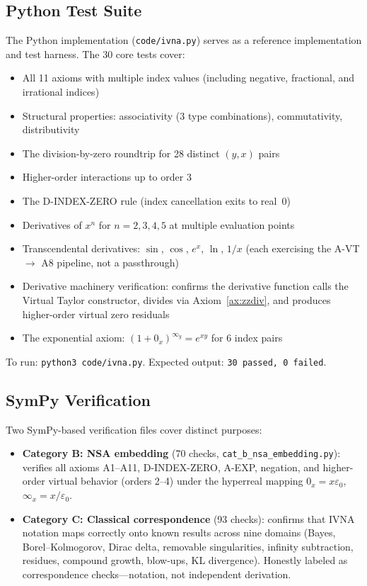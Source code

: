 \documentclass[12pt]{article}
\theoremstyle{definition}
\theoremstyle{remark}
\newcommand{\vz}[1]{0_{#1}}             %
\newcommand{\vi}[1]{\infty_{#1}}        %
\begin{document}
\subsection{Python Test Suite}

The Python implementation (\texttt{code/ivna.py}) serves as a reference
implementation and test harness. The 30 core tests cover:

\begin{itemize}
\item All 11 axioms with multiple index values (including negative,
  fractional, and irrational indices)
\item Structural properties: associativity (3 type combinations),
  commutativity, distributivity
\item The division-by-zero roundtrip for 28 distinct $(y, x)$ pairs
\item Higher-order interactions up to order 3
\item The D-INDEX-ZERO rule (index cancellation exits to real~0)
\item Derivatives of $x^n$ for $n = 2, 3, 4, 5$ at multiple evaluation points
\item Transcendental derivatives: $\sin$, $\cos$, $e^x$, $\ln$, $1/x$
  (each exercising the A-VT $\to$ A8 pipeline, not a passthrough)
\item Derivative machinery verification: confirms the derivative
  function calls the Virtual Taylor constructor, divides via
  Axiom~\ref{ax:zzdiv}, and produces higher-order virtual zero
  residuals
\item The exponential axiom: $(1 + \vz{x})^{\vi{y}} = e^{xy}$ for
  6 index pairs
\end{itemize}

\noindent
To run: \texttt{python3 code/ivna.py}. Expected output:
\texttt{30 passed, 0 failed}.

\subsection{SymPy Verification}

Two SymPy-based verification files cover distinct purposes:

\begin{itemize}
\item \textbf{Category B: NSA embedding} (70 checks,
  \texttt{cat\_b\_nsa\_embedding.py}): verifies all axioms A1--A11,
  D-INDEX-ZERO, A-EXP, negation, and higher-order virtual behavior
  (orders 2--4) under the hyperreal mapping $\vz{x} = x\varepsilon_0$,
  $\vi{x} = x/\varepsilon_0$.
\item \textbf{Category C: Classical correspondence} (93 checks):
  confirms that IVNA notation maps correctly onto known results
  across nine domains (Bayes, Borel--Kolmogorov, Dirac delta,
  removable singularities, infinity subtraction, residues,
  compound growth, blow-ups, KL divergence). Honestly labeled
  as correspondence checks---notation, not independent derivation.
\end{itemize}
\end{document}
